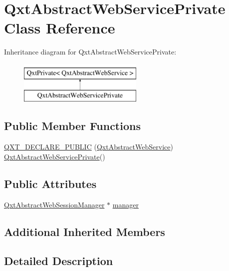 \hypertarget{class_qxt_abstract_web_service_private}{\section{Qxt\-Abstract\-Web\-Service\-Private Class Reference}
\label{class_qxt_abstract_web_service_private}
}
Inheritance diagram for Qxt\-Abstract\-Web\-Service\-Private\-:\begin{figure}[H]
\begin{center}
\leavevmode
\includegraphics[height=2.000000cm]{class_qxt_abstract_web_service_private}
\end{center}
\end{figure}
\subsection*{Public Member Functions}
\begin{DoxyCompactItemize}
\item 
\hyperlink{class_qxt_abstract_web_service_private_adf1adedd75172bbd7bf4e8af0ff45f1a}{Q\-X\-T\-\_\-\-D\-E\-C\-L\-A\-R\-E\-\_\-\-P\-U\-B\-L\-I\-C} (\hyperlink{class_qxt_abstract_web_service}{Qxt\-Abstract\-Web\-Service}) \hyperlink{class_qxt_abstract_web_service_private}{Qxt\-Abstract\-Web\-Service\-Private}()
\end{DoxyCompactItemize}
\subsection*{Public Attributes}
\begin{DoxyCompactItemize}
\item 
\hyperlink{class_qxt_abstract_web_session_manager}{Qxt\-Abstract\-Web\-Session\-Manager} $\ast$ \hyperlink{class_qxt_abstract_web_service_private_acd746baa60c5f3520bdc4058f395332b}{manager}
\end{DoxyCompactItemize}
\subsection*{Additional Inherited Members}


\subsection{Detailed Description}


